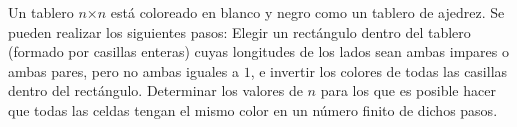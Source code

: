 Un tablero $n$×$n$ está coloreado en blanco y negro como un tablero de ajedrez. Se pueden realizar los siguientes pasos: Elegir un rectángulo dentro del tablero (formado por casillas enteras) cuyas longitudes de los lados sean ambas impares o ambas pares, pero no ambas iguales a $1$, e invertir los colores de todas las casillas dentro del rectángulo. Determinar los valores de $n$ para los que es posible hacer que todas las celdas tengan el mismo color en un número finito de dichos pasos. 
